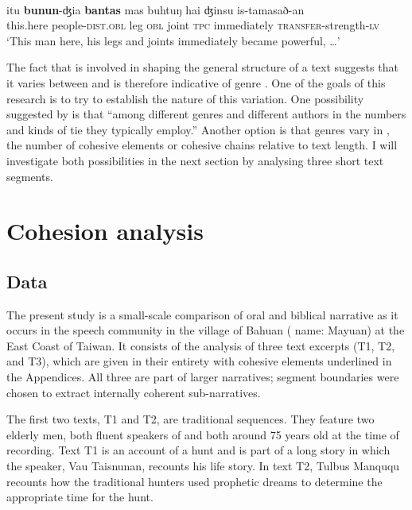 \documentclass[output=paper
,modfonts
,nonflat]{langsci/langscibook}
\begin{document}
\begin{exe}
		\label{e5}\\
		\gll itu  \textbf{bunun}-ʤia  \textbf{bantas}  mas  buhtuŋ  hai  ʤinsu  is-tamasað-an\\
		this.here  people-\textsc{dist}.\textsc{obl}  leg  \textsc{obl}  joint  \textsc{tpc}  immediately  \textsc{transfer}-strength-\textsc{lv}\\
		\glt `This man here, his legs and joints immediately became powerful, …’
\end{exe}

\noindent
The fact that  is involved in shaping the general structure of a text suggests that it varies between and is therefore indicative of genre \citep{Martin2001}. One of the goals of this research is to try to establish the nature of this variation. One possibility suggested by \citet[4]{Halliday1976} is that “among different genres and different authors in the numbers and kinds of tie they typically employ.” Another option is that genres vary in , the number of cohesive elements or cohesive chains relative to text length. I will investigate both possibilities in the next section by analysing three short text segments.

\section{\label{s2}Cohesion analysis}

\subsection{\label{s2.1}Data}

The present study is a small-scale comparison of oral and biblical narrative as it occurs in the   speech community in the village of Bahuan ( name: Mayuan) at the East Coast of Taiwan. It consists of the analysis of three text excerpts (T1, T2, and T3), which are given in their entirety with cohesive elements underlined in the Appendices. All three are part of larger narratives; segment boundaries were chosen to extract internally coherent sub-narratives.

The first two texts, T1 and T2, are traditional  sequences. They feature two elderly men, both fluent speakers of   and both around 75 years old at the time of recording. Text T1 is an account of a hunt and is part of a long story in which the speaker, Vau Taisnunan, recounts his life story. In text T2, Tulbus Manququ recounts how the traditional  hunters used prophetic dreams to determine the appropriate time for the hunt.
\end{document}

